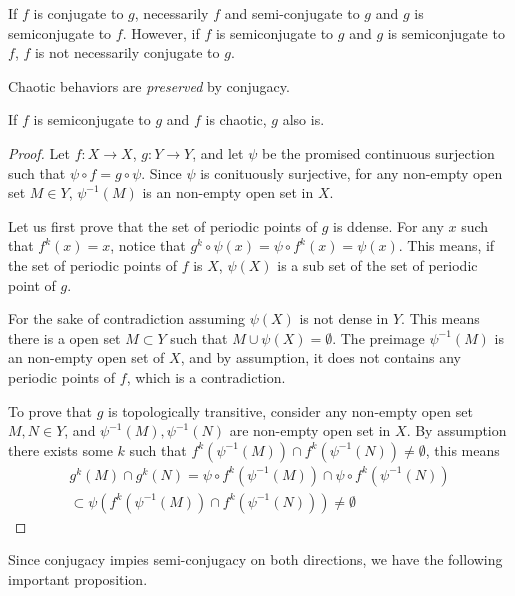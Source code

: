 If $f$ is conjugate to $g$, necessarily $f$ and semi-conjugate to $g$ and $g$ is semiconjugate to $f$. 
However, if $f$ is semiconjugate to $g$ and $g$ is semiconjugate to $f$, $f$ is not necessarily conjugate to $g$. 

Chaotic behaviors are \emph{preserved} by conjugacy.


\begin{thm}\label{th_semicong_chaos}
	If $f$ is semiconjugate to $g$ and $f$ is chaotic, $g$ also is.
\end{thm}

\begin{proof}
	Let $f: X \rightarrow X$, $g:  Y \rightarrow Y$, and let $\psi$ be the promised continuous surjection such that
	$\psi \circ f = g \circ \psi$. 
	Since $\psi$ is conituously surjective, for any non-empty open set $M \in Y$, $\psi^{-1}(M)$ is an non-empty open set in $X$.

	Let us first prove that the set of periodic points of $g$ is ddense.
	For any $x$ such that $f^k(x) = x$, notice that $g^k \circ \psi (x) = \psi \circ f^k (x) = \psi(x)$. 
	This means, if the set of periodic points of $f$ is $X$, $\psi(X)$ is a sub set of the set of periodic point of $g$.

	For the sake of contradiction assuming $\psi(X)$ is not dense in $Y$. 
	This means there is a open set $M \subset Y$ such that $M \cup \psi(X) = \emptyset$.
	The preimage $\psi^{-1}(M)$ is an non-empty open set of $X$, and by assumption, it does not contains any periodic points of $f$, which is a contradiction.

	To prove that $g$ is topologically transitive, consider any non-empty open set $M, N \in Y$, and $\psi^{-1}(M), \psi^{-1}(N)$ are non-empty open set in $X$. 
	By assumption there exists some $k$ such that $f^k(\psi^{-1}(M)) \cap f^k(\psi^{-1}(N)) \neq \emptyset$, this means 
	\begin{align*}
		g^k(M) \cap g^k(N) = \psi \circ f^k(\psi^{-1}(M)) \cap \psi \circ f^k(\psi^{-1}(N)) \\
		\subset \psi( f^k(\psi^{-1}(M)) \cap  f^k(\psi^{-1}(N))) \neq \emptyset
	\end{align*}
\end{proof}

Since conjugacy impies semi-conjugacy on both directions, we have the following important proposition.

